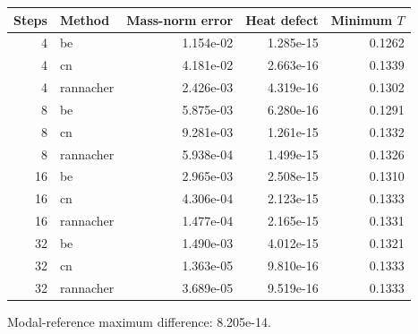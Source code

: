 \begin{center}\small
\begin{tabular}{rlrrr}\toprule
Steps & Method & Mass-norm error & Heat defect & Minimum $T$\\\midrule
4 & be & 1.154e-02 & 1.285e-15 & 0.1262\\
4 & cn & 4.181e-02 & 2.663e-16 & 0.1339\\
4 & rannacher & 2.426e-03 & 4.319e-16 & 0.1302\\
8 & be & 5.875e-03 & 6.280e-16 & 0.1291\\
8 & cn & 9.281e-03 & 1.261e-15 & 0.1332\\
8 & rannacher & 5.938e-04 & 1.499e-15 & 0.1326\\
16 & be & 2.965e-03 & 2.508e-15 & 0.1310\\
16 & cn & 4.306e-04 & 2.123e-15 & 0.1333\\
16 & rannacher & 1.477e-04 & 2.165e-15 & 0.1331\\
32 & be & 1.490e-03 & 4.012e-15 & 0.1321\\
32 & cn & 1.363e-05 & 9.810e-16 & 0.1333\\
32 & rannacher & 3.689e-05 & 9.519e-16 & 0.1333\\
\bottomrule\end{tabular}
\par Modal-reference maximum difference: 8.205e-14.
\end{center}

